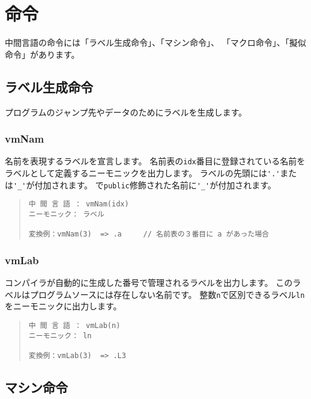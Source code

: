 \section{命令}

中間言語の命令には「ラベル生成命令」、「マシン命令」、
「マクロ命令」、「擬似命令」があります。

\subsection{ラベル生成命令}

プログラムのジャンプ先やデータのためにラベルを生成します。

\subsubsection{vmNam}

名前を表現するラベルを宣言します。
名前表の\verb/idx/番目に登録されている名前を
ラベルとして定義するニーモニックを出力します。
ラベルの先頭には\verb/'.'/または\verb/'_'/が付加されます。
\cmml で\verb/public/修飾された名前に\verb/'_'/が付加されます。

\begin{quote}
\begin{verbatim}
中 間 言 語 ： vmNam(idx)
ニーモニック： ラベル

変換例：vmNam(3)  => .a     // 名前表の３番目に a があった場合
\end{verbatim}
\end{quote}

\subsubsection{vmLab}

コンパイラが自動的に生成した番号で管理されるラベルを出力します。
このラベルは\cmm プログラムソースには存在しない名前です。
整数\verb/n/で区別できるラベル\verb/ln/をニーモニックに出力します。

\begin{quote}
\begin{verbatim}
中 間 言 語 ： vmLab(n)
ニーモニック： ln

変換例：vmLab(3)  => .L3
\end{verbatim}
\end{quote}

\subsection{マシン命令}


